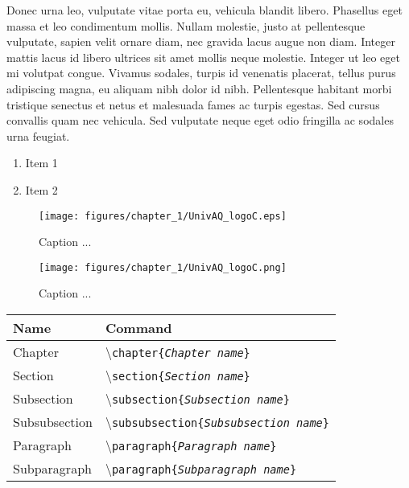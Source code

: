 Donec urna leo, vulputate vitae porta eu, vehicula blandit libero. Phasellus eget massa et leo condimentum mollis. Nullam molestie, justo at pellentesque vulputate, sapien velit ornare diam, nec gravida lacus augue non diam. Integer mattis lacus id libero ultrices sit amet mollis neque molestie. Integer ut leo eget mi volutpat congue. Vivamus sodales, turpis id venenatis placerat, tellus purus adipiscing magna, eu aliquam nibh dolor id nibh. Pellentesque habitant morbi tristique senectus et netus et malesuada fames ac turpis egestas. Sed cursus convallis quam nec vehicula. Sed vulputate neque eget odio fringilla ac sodales urna feugiat.

\begin{enumerate}
    \item Item 1
    \item Item 2
\end{enumerate}

\begin{figure}[!ht]
	\texttt{[image: figures/chapter\_1/UnivAQ\_logoC.eps]}
	\centering
	\caption{Caption ...}\label{fig:caption_ref_eps}
\end{figure}

\begin{figure}[!ht]
	\texttt{[image: figures/chapter\_1/UnivAQ\_logoC.png]}
	\centering
	\caption{Caption ...}\label{fig:caption_ref_png}
\end{figure}



\begin{table}[H]
\centering
\begin{tabular}{ll} \hline\hline
Name & Command\\ \hline
Chapter & \textbackslash\texttt{chapter\{\emph{Chapter name}\}}\\
Section & \textbackslash\texttt{section\{\emph{Section name}\}}\\
Subsection & \textbackslash\texttt{subsection\{\emph{Subsection name}\}}\\
Subsubsection & \textbackslash\texttt{subsubsection\{\emph{Subsubsection name}\}}\\
Paragraph & \textbackslash\texttt{paragraph\{\emph{Paragraph name}\}}\\
Subparagraph & \textbackslash\texttt{paragraph\{\emph{Subparagraph name}\}}\\ \hline\hline
\end{tabular}
\end{table}
